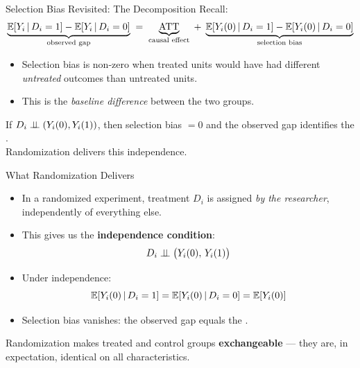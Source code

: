 \documentclass[aspectratio=169, 11pt]{beamer}
\begin{document}
\begin{frame}[t]{Selection Bias Revisited: The Decomposition}
\vspace{0.2em}
Recall:
\[
  \underbrace{\mathbb{E}\!\left[Y_i\,\middle|\,D_i=1\right] - \mathbb{E}\!\left[Y_i\,\middle|\,D_i=0\right]}_{\text{observed gap}}
  \;=\;
  \underbrace{\mathrm{ATT}}_{\text{causal effect}}
  \;+\;
  \underbrace{\mathbb{E}\!\left[Y_{i}(0)\,\middle|\,D_i=1\right] - \mathbb{E}\!\left[Y_{i}(0)\,\middle|\,D_i=0\right]}_{\text{selection bias}}
\]
\vspace{0.3em}
\begin{itemize}
  \setlength\itemsep{0.4em}
  \item Selection bias is non-zero when treated units would have had different
        \emph{untreated} outcomes than untreated units.
  \item This is the \emph{baseline difference} between the two groups.
\end{itemize}
\vspace{0.3em}
\begin{keybox}
If $D_i \perp\!\!\!\perp (Y_{i}(0), Y_{i}(1))$, then selection bias $= 0$
and the observed gap identifies the \ATE.\\
Randomization delivers this independence.
\end{keybox}
\end{frame}


\begin{frame}[t]{What Randomization Delivers}
\begin{itemize}
  \setlength\itemsep{0.5em}
  \item In a randomized experiment, treatment $D_i$ is assigned \emph{by the researcher},
        independently of everything else.
  \item This gives us the \textbf{independence condition}:
  \[
    D_i \perp\!\!\!\perp \bigl(Y_{i}(0),\,Y_{i}(1)\bigr)
  \]
  \item Under independence:
  \[
    \mathbb{E}\!\left[Y_{i}(0)\,\middle|\,D_i=1\right] = \mathbb{E}\!\left[Y_{i}(0)\,\middle|\,D_i=0\right] = \mathbb{E}\!\left[Y_{i}(0)\right]
  \]
  \item Selection bias vanishes: the observed gap equals the \ATE.
\end{itemize}
\vspace{0.3em}
\begin{intuitionbox}
Randomization makes treated and control groups \textbf{exchangeable}
— they are, in expectation, identical on all characteristics.
\end{intuitionbox}
\end{frame}
\end{document}
